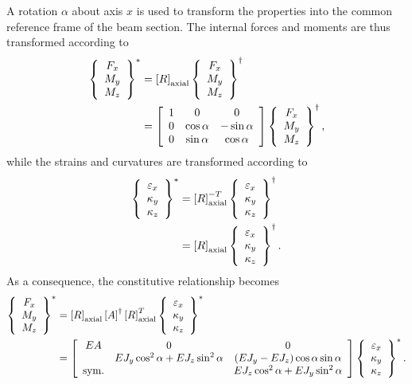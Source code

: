 A rotation $\alpha$ about axis $x$ is used to transform the properties
into the common reference frame of the beam section.
The internal forces and moments are thus transformed according to 
\begin{align}
	\cubr{\cvvect{
		F_x \\
		M_y \\
		M_z \\
	}}^*
	&=
	\sqbr{R}_{\text{axial}} \cubr{\cvvect{
		F_x \\
		M_y \\
		M_z \\
	}}^{\dagger}
	\nonumber \\
	&=
	\sqbr{\matr{ccc}{
		1 & 0 & 0 \\
		0 & \cos\alpha & -\sin\alpha \\
		0 & \sin\alpha & \cos\alpha
	}} \cubr{\cvvect{
		F_x \\
		M_y \\
		M_z \\
	}}^{\dagger}
	,
\end{align}
while the strains and curvatures are transformed according to
\begin{align}
	\cubr{\cvvect{
		\varepsilon_x \\
		\kappa_y \\
		\kappa_z \\
	}}^*
	&= \sqbr{R}^{-T}_{\text{axial}} \cubr{\cvvect{
		\varepsilon_x \\
		\kappa_y \\
		\kappa_z \\
	}}^{\dagger}
	\nonumber \\
	&= \sqbr{R}_{\text{axial}} \cubr{\cvvect{
		\varepsilon_x \\
		\kappa_y \\
		\kappa_z \\
	}}^{\dagger}
	.
\end{align}
As a consequence, the constitutive relationship becomes
\begin{align}
	\cubr{\cvvect{
		F_x \\
		M_y \\
		M_z \\
	}}^*
	&=
	\sqbr{R}_{\text{axial}} \sqbr{A}^{\dagger} \sqbr{R}_{\text{axial}}^T
	\cubr{\cvvect{
		\varepsilon_x \\
		\kappa_y \\
		\kappa_z \\
	}}^*
	\nonumber \\
	&= \sqbr{\matr{ccc}{
		EA & 0 & 0 \\
		& EJ_y \cos^2\alpha + EJ_z \sin^2\alpha
			& \plbr{EJ_y - EJ_z}\cos\alpha\sin\alpha \\
		\text{sym.} & & EJ_z \cos^2\alpha + EJ_y \sin^2\alpha
	}}
	\cubr{\cvvect{
		\varepsilon_x \\
		\kappa_y \\
		\kappa_z \\
	}}^*
	.
\end{align}

